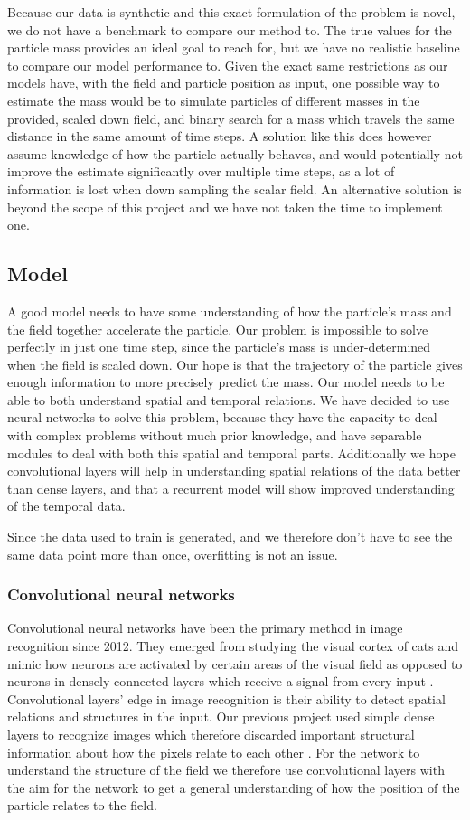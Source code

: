 \documentclass[a4paper]{article}
\begin{document}
Because our data is synthetic and this exact formulation of the problem is novel, we do not have a benchmark to compare our method to. The true values for the particle mass provides an ideal goal to reach for, but we have no realistic baseline to compare our model performance to. Given the exact same restrictions as our models have, with the field and particle position as input, one possible way to estimate the mass would be to simulate particles of different masses in the provided, scaled down field, and binary search for a mass which travels the same distance in the same amount of time steps. A solution like this does however assume knowledge of how the particle actually behaves, and would potentially not improve the estimate significantly over multiple time steps, as a lot of information is lost when down sampling the scalar field. An alternative solution is beyond the scope of this project and we have not taken the time to implement one.

\subsection{Model}
A good model needs to have some understanding of how the particle's mass and the field together accelerate the particle. Our problem is impossible to solve perfectly in just one time step, since the particle's mass is under-determined when the field is scaled down. Our hope is that the trajectory of the particle gives enough information to more precisely predict the mass. Our model needs to be able to both understand spatial and temporal relations. We have decided to use neural networks to solve this problem, because they have the capacity to deal with complex problems without much prior knowledge, and have separable modules to deal with both this spatial and temporal parts. Additionally we hope convolutional layers will help in understanding spatial relations of the data better than dense layers, and that a recurrent model will show improved understanding of the temporal data.

Since the data used to train is generated, and we therefore don't have to see the same data point more than once, overfitting is not an issue.

\subsubsection{Convolutional neural networks}
Convolutional neural networks have been the primary method in image recognition since 2012. They emerged from studying the visual cortex of cats and mimic how neurons are activated by certain areas of the visual field as opposed to neurons in densely connected layers which receive a signal from every input \cite{Geron}. Convolutional layers' edge in image recognition is their ability to detect spatial relations and structures in the input. Our previous project used simple dense layers to recognize images which therefore discarded important structural information about how the pixels relate to each other \cite{didsev}. For the network to understand the structure of the field we therefore use convolutional layers with the aim for the network to get a general understanding of how the position of the particle relates to the field. 
\end{document}
